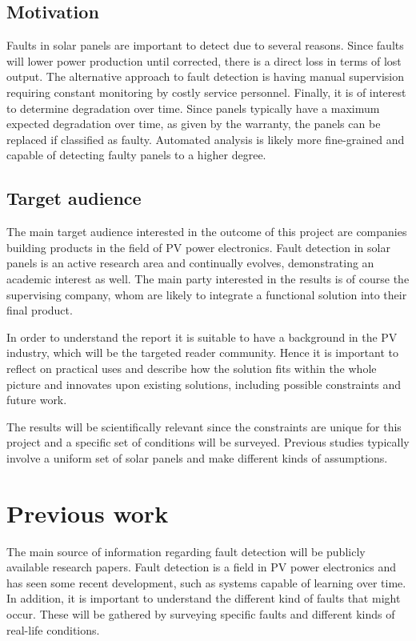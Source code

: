 \documentclass[a4paper,11pt]{article}
\begin{document}
\subsection*{Motivation}
Faults in solar panels are important to detect due to several reasons.
Since faults will lower power production until corrected, there is a direct loss in terms of lost output.
The alternative approach to fault detection is having manual supervision requiring constant monitoring by costly service personnel.
Finally, it is of interest to determine degradation over time.
Since panels typically have a maximum expected degradation over time, as given by the warranty, the panels can be replaced if classified as faulty.
Automated analysis is likely more fine-grained and capable of detecting faulty panels to a higher degree.

\subsection*{Target audience}
The main target audience interested in the outcome of this project are companies building products in the field of PV power electronics.
Fault detection in solar panels is an active research area and continually evolves, demonstrating an academic interest as well.
The main party interested in the results is of course the supervising company, whom are likely to
integrate a functional solution into their final product.

In order to understand the report it is suitable to have a background in the PV industry, which will be the targeted reader community.
Hence it is important to reflect on practical uses and describe how the solution fits within the whole picture and innovates upon existing solutions, including possible constraints and future work.

The results will be scientifically relevant since the constraints are unique for this project and a specific set of conditions will be surveyed.
Previous studies typically involve a uniform set of solar panels and make different kinds of assumptions.

\section*{Previous work}
The main source of information regarding fault detection will be publicly available research papers.
Fault detection is a field in PV power electronics and has seen some recent development, such as systems capable of learning over time.
In addition, it is important to understand the different kind of faults that might occur.
These will be gathered by surveying specific faults and different kinds of real-life conditions.
\end{document}
